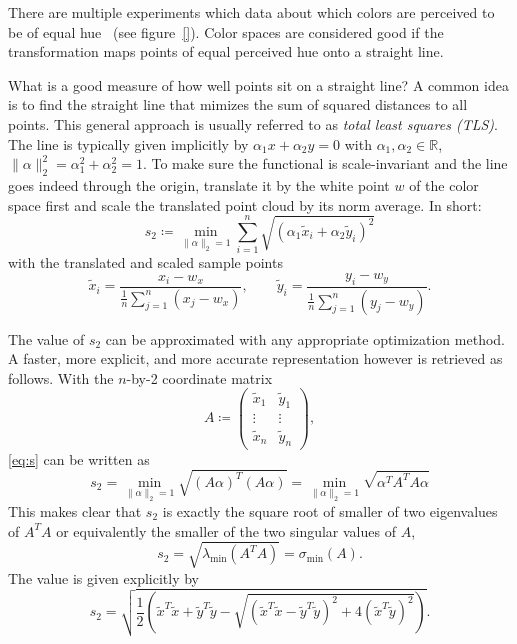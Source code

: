 \documentclass{scrartcl}
\theoremstyle{named}
\newcommand\R{\ensuremath{\mathbb{R}}}
\begin{document}
There are multiple experiments which data about which colors are perceived to be of
equal hue~\cite{ebner,xiao,hung} (see figure~\ref{}). Color spaces are considered good
if the transformation maps points of equal perceived hue onto a straight line.

What is a good measure of how well points sit on a straight line?
A common idea is to find the straight line that mimizes the sum of squared distances to
all points. This general approach is usually referred to as \emph{total least squares
(TLS)}.
The line is typically given implicitly by $\alpha_1 x + \alpha_2 y
= 0$ with $\alpha_1,\alpha_2\in\R$, $\|\alpha\|_2^2 = \alpha_1^2 + \alpha_2^2 = 1$.
To make sure the functional is scale-invariant and the line goes indeed through the
origin, translate it by the white point $w$ of the color space first and scale the
translated point cloud by its norm average.
In short:
\begin{equation}\label{eq:s}
s_2 \coloneqq
\min_{\|\alpha\|_2=1}
  \sum_{i=1}^n \sqrt{(\alpha_1 \tilde{x}_i + \alpha_2 \tilde{y}_i)^2}
\end{equation}
with the translated and scaled sample points
\[
  \tilde{x}_i = \frac{x_i-w_x}{\frac{1}{n}\sum_{j=1}^n (x_j-w_x)},\qquad
  \tilde{y}_i = \frac{y_i-w_y}{\frac{1}{n}\sum_{j=1}^n (y_j-w_y)}.
\]

The value of $s_2$ can be approximated with any appropriate optimization method. A
faster, more explicit, and more accurate representation however is retrieved as follows.
With the $n$-by-2 coordinate matrix
\[
  A \coloneqq \begin{pmatrix}
    \tilde{x}_1 & \tilde{y}_1\\
    \vdots & \vdots\\
    \tilde{x}_n & \tilde{y}_n
  \end{pmatrix},
\]
\eqref{eq:s} can be written as
\[
  s_2
  = \min_{\|\alpha\|_2=1} \sqrt{(A \alpha)^T (A \alpha)}
  = \min_{\|\alpha\|_2=1} \sqrt{\alpha^T A^T A \alpha}
\]
This makes clear that $s_2$ is exactly the square root of smaller of two eigenvalues of
$A^TA$ or equivalently the smaller of the two singular values of $A$,
\[
s_2
= \sqrt{\lambda_{\min}(A^T A)}
= \sigma_{\min}(A).
\]
The value is given explicitly by
\begin{equation}\label{eq:s2}
  s_2 = \sqrt{
    \frac{1}{2} \left(
      \tilde{x}^T\tilde{x}
      + \tilde{y}^T\tilde{y}
      - \sqrt{(\tilde{x}^T\tilde{x} - \tilde{y}^T\tilde{y})^2 + 4 (\tilde{x}^T\tilde{y})^2}
      \right)
    }.
\end{equation}
\end{document}
